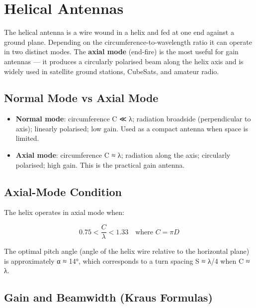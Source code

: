 \section{Helical Antennas}\label{sec:wiki_helical}



The helical antenna is a wire wound in a helix and fed at one end against a ground plane. Depending on the circumference-to-wavelength ratio it can operate in two distinct modes. The \textbf{axial mode} (end-fire) is the most useful for gain antennas — it produces a circularly polarised beam along the helix axis and is widely used in satellite ground stations, CubeSats, and amateur radio.

				

\subsection{Normal Mode vs Axial Mode}

				
\begin{itemize}

					\item \textbf{Normal mode}: circumference C ≪ λ; radiation broadside (perpendicular to axis); linearly polarised; low gain. Used as a compact antenna when space is limited.

					\item \textbf{Axial mode}: circumference C ≈ λ; radiation along the axis; circularly polarised; high gain. This is the practical gain antenna.

				
\end{itemize}

				

\subsection{Axial-Mode Condition}

				

The helix operates in axial mode when:

				
\[0.75 < \dfrac{C}{\lambda} < 1.33 \quad \text{where } C = \pi D\]

				

The optimal pitch angle (angle of the helix wire relative to the horizontal plane) is approximately α ≈ 14°, which corresponds to a turn spacing S ≈ λ/4 when C ≈ λ.

				

\subsection{Gain and Beamwidth (Kraus Formulas)}

